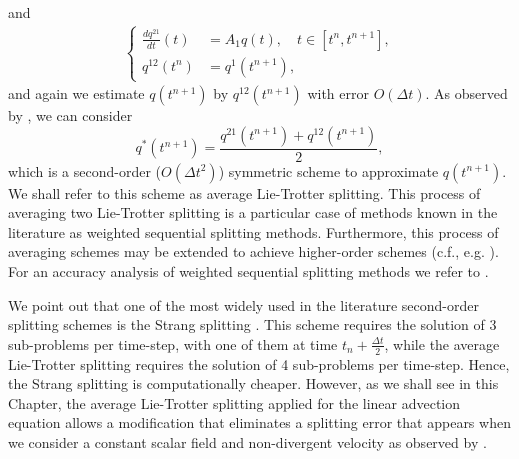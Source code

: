 and 
\begin{align*}
	\begin{cases}
		\frac{dq^{21}}{dt}(t) &= A_1q(t), \quad t \in [t^n,t^{n+1}],\\
		q^{12}(t^n) &= q^1(t^{n+1}),
	\end{cases}
\end{align*}
and again we estimate $q(t^{n+1})$ by $q^{12}(t^{n+1})$ with error $O(\Delta t)$.
As observed by \citet{strang:1968}, we can consider
\begin{equation}
	q^*(t^{n+1}) = \frac{q^{21}(t^{n+1}) + q^{12}(t^{n+1})}{2},
\end{equation}
which is a second-order ($O(\Delta t^2)$) symmetric scheme to approximate $q(t^{n+1})$. 
We shall refer to this scheme as average Lie-Trotter splitting.
This process of averaging two Lie-Trotter splitting is a particular case of methods known in the literature as 
weighted sequential splitting methods. 
Furthermore, this process of averaging schemes may be extended to achieve higher-order schemes (c.f., e.g. \citet{jia:2011}).
For an accuracy analysis of weighted sequential splitting methods we refer to \citet{csomos:2005}.

We point out that one of the most widely used in the literature second-order splitting schemes is the Strang splitting \citep{strang:1968}.
This scheme requires the solution of 3 sub-problems per time-step, with one of them at time $t_n+\frac{\Delta t}{2}$,
while the average Lie-Trotter splitting requires the solution of 4 sub-problems per time-step.
Hence, the Strang splitting is computationally cheaper. 
However, as we shall see in this Chapter, the average Lie-Trotter splitting applied for the linear advection equation
allows a modification that eliminates a splitting error that appears when we consider a constant
scalar field and non-divergent velocity as observed by \citet{lin:1996}.

